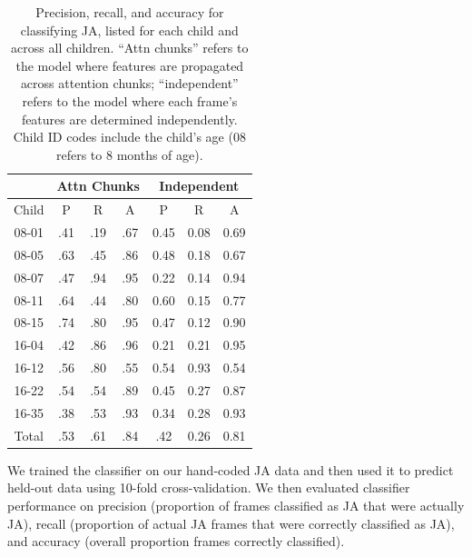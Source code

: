 \documentclass[10pt,letterpaper]{article}
\begin{document}
\begin{table}[t]
\centering
\begin{tabular}{c|ccc|ccc}
 &\multicolumn{3}{c}{Attn Chunks} & \multicolumn{3}{c}{Independent} \\
\hline
Child & P & R & A & P & R & A \\
\hline
08-01 & .41 & .19 & .67 & 0.45 & 0.08 & 0.69\\
08-05 & .63 & .45 & .86 & 0.48 & 0.18 & 0.67  \\
08-07 & .47 & .94 & .95 & 0.22 & 0.14 & 0.94  \\
08-11 & .64 & .44 & .80 & 0.60 & 0.15 & 0.77  \\
08-15 & .74 & .80 & .95 & 0.47 & 0.12 & 0.90 \\
16-04 & .42 & .86 & .96 & 0.21 & 0.21 & 0.95 \\
16-12 & .56 & .80 & .55 & 0.54 & 0.93 & 0.54 \\
16-22 & .54 & .54 & .89 & 0.45 & 0.27 & 0.87  \\
16-35 & .38 & .53 & .93 & 0.34 & 0.28 & 0.93\\

\hline
Total & .53 & .61 & .84 & .42 &  0.26 &  0.81\\

\hline
\end{tabular}
\caption{Precision, recall, and accuracy for classifying JA, listed for each child and across all children. ``Attn chunks'' refers to the model where features are propagated across attention chunks; ``independent'' refers to the model where each frame's features are determined independently. Child ID codes include the child's age (08 refers to 8 months of age).}
\label{tb:Results2}
\end{table}

We trained the classifier on our hand-coded JA data and then used it to predict held-out data using 10-fold cross-validation. We then evaluated classifier performance on precision (proportion of frames classified as JA that were actually JA), recall (proportion of actual JA frames that were correctly classified as JA), and accuracy (overall proportion frames correctly classified). 
\end{document}
